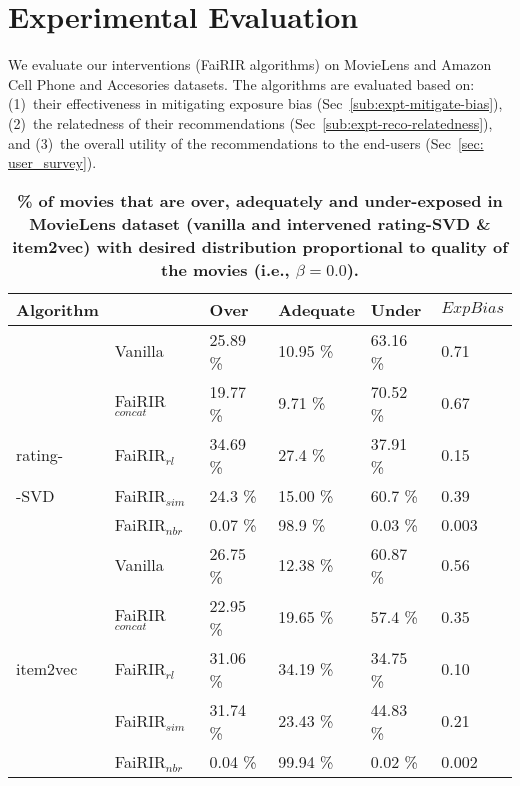 \vspace{-2mm}
\section{Experimental Evaluation} \label{sec:evaluation}
We evaluate our interventions (FaiRIR algorithms) on %
MovieLens and Amazon Cell Phone and Accesories datasets. 
The algorithms are evaluated based on: (1)~their effectiveness in mitigating exposure bias (Sec~\ref{sub:expt-mitigate-bias}), (2)~the relatedness of their recommendations (Sec~\ref{sub:expt-reco-relatedness}), and (3)~the overall utility  of the recommendations to the end-users (Sec~\ref{sec: user_survey}). 

\begin{table}[tb]
	\noindent
	\scriptsize
	\centering
	\begin{tabular}{|p{0.85cm}|p{1.2cm}||p{1.0cm}|p{1.0 cm}|p{1.0cm}||p{1.0 cm}| }
		\hline
		Algorithm &  & Over & Adequate & Under & $ExpBias$ \\
		\hline
		& Vanilla 	& 25.89 \% & 10.95 \% & 63.16 \% & 0.71\\ \cline{2-6}
		& FaiRIR$_{concat}$	& 19.77 \% & 9.71 \% & 70.52 \% & 0.67\\ \cline{2-6}
		rating-& FaiRIR$_{rl}$	& 34.69 \% & 27.4 \% & 37.91 \% & 0.15\\ \cline{2-6}
		 -SVD& FaiRIR$_{sim}$	& 24.3 \% & 15.00 \% & 60.7 \% & 0.39\\ \cline{2-6}
		& FaiRIR$_{nbr}$	& 0.07 \% & 98.9 \% & 0.03 \% & 0.003\\ \cline{2-6}
		\hline \hline
		& Vanilla 		& 26.75 \%& 12.38 \% & 60.87 \% & 0.56  \\ \cline{2-6}
		& FaiRIR$_{concat}$	& 22.95 \%& 19.65 \% & 57.4 \% & 0.35  \\ \cline{2-6}
		item2vec & FaiRIR$_{rl}$	& 31.06 \%& 34.19 \% & 34.75 \% & 0.10  \\ \cline{2-6}
		& FaiRIR$_{sim}$	& 31.74 \%& 23.43 \% & 44.83 \% & 0.21  \\ \cline{2-6}
		& FaiRIR$_{nbr}$	& 0.04 \% & 99.94 \% & 0.02 \% & 0.002  \\ \cline{2-6}
		\hline %
	\end{tabular}
	\caption{{\bf \% of movies that are over, adequately and under-exposed in MovieLens dataset (vanilla and %
			intervened rating-SVD \& item2vec) with desired distribution proportional to quality of the movies (i.e., $\beta = 0.0$).}}
	\label{Tab: ML-10M}
	\vspace{-2mm}
\end{table}

